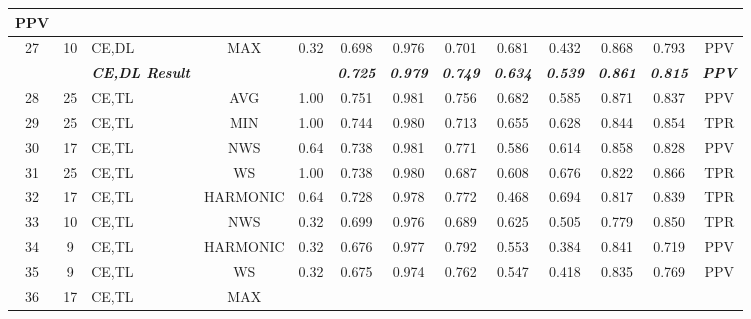 \begin{table}[H]
{\begin{tabular}{cc|l|cc|c|c|c|c|c|c|c|c|}
    PPV \\ \hline
  \multicolumn{1}{|c|}{27} &
    10 &
    CE,DL &
    \multicolumn{1}{c|}{MAX} &
    0.32 &
    0.698 &
    0.976 &
    0.701 &
    0.681 &
    0.432 &
    0.868 &
    0.793 &
    PPV \\ \hline
   &
    \textit{\textbf{}} &
    \textit{\textbf{CE,DL Result}} &
     &
     &
    \textit{\textbf{0.725}} &
    \textit{\textbf{0.979}} &
    \textit{\textbf{0.749}} &
    \textit{\textbf{0.634}} &
    \textit{\textbf{0.539}} &
    \textit{\textbf{0.861}} &
    \textit{\textbf{0.815}} &
    \textit{\textbf{PPV}} \\ \hline
  \multicolumn{1}{|c|}{28} &
    25 &
    CE,TL &
    \multicolumn{1}{c|}{AVG} &
    1.00 &
    0.751 &
    0.981 &
    0.756 &
    0.682 &
    0.585 &
    0.871 &
    0.837 &
    PPV \\ \hline
  \multicolumn{1}{|c|}{29} &
    25 &
    CE,TL &
    \multicolumn{1}{c|}{MIN} &
    1.00 &
    0.744 &
    0.980 &
    0.713 &
    0.655 &
    0.628 &
    0.844 &
    0.854 &
    TPR \\ \hline
  \multicolumn{1}{|c|}{30} &
    17 &
    CE,TL &
    \multicolumn{1}{c|}{NWS} &
    0.64 &
    0.738 &
    0.981 &
    0.771 &
    0.586 &
    0.614 &
    0.858 &
    0.828 &
    PPV \\ \hline
  \multicolumn{1}{|c|}{31} &
    25 &
    CE,TL &
    \multicolumn{1}{c|}{WS} &
    1.00 &
    0.738 &
    0.980 &
    0.687 &
    0.608 &
    0.676 &
    0.822 &
    0.866 &
    TPR \\ \hline
  \multicolumn{1}{|c|}{32} &
    17 &
    CE,TL &
    \multicolumn{1}{c|}{HARMONIC} &
    0.64 &
    0.728 &
    0.978 &
    0.772 &
    0.468 &
    0.694 &
    0.817 &
    0.839 &
    TPR \\ \hline
  \multicolumn{1}{|c|}{33} &
    10 &
    CE,TL &
    \multicolumn{1}{c|}{NWS} &
    0.32 &
    0.699 &
    0.976 &
    0.689 &
    0.625 &
    0.505 &
    0.779 &
    0.850 &
    TPR \\ \hline
  \multicolumn{1}{|c|}{34} &
    9 &
    CE,TL &
    \multicolumn{1}{c|}{HARMONIC} &
    0.32 &
    0.676 &
    0.977 &
    0.792 &
    0.553 &
    0.384 &
    0.841 &
    0.719 &
    PPV \\ \hline
  \multicolumn{1}{|c|}{35} &
    9 &
    CE,TL &
    \multicolumn{1}{c|}{WS} &
    0.32 &
    0.675 &
    0.974 &
    0.762 &
    0.547 &
    0.418 &
    0.835 &
    0.769 &
    PPV \\ \hline
  \multicolumn{1}{|c|}{36} &
    17 &
    CE,TL &
    \multicolumn{1}{c|}{MAX} &

\end{tabular}}
\end{table}
